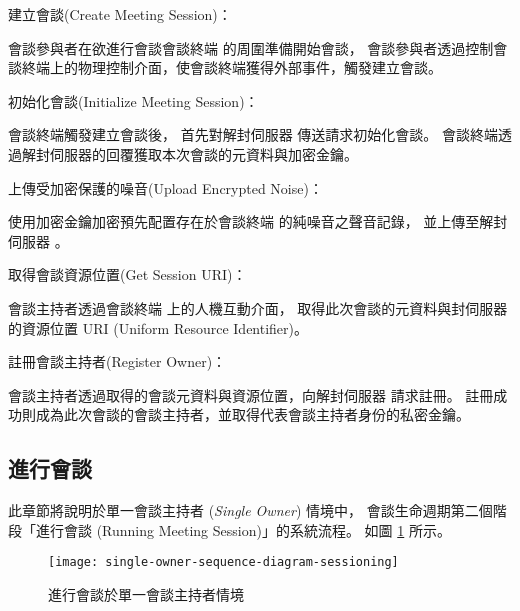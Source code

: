 \begin{steps}
    \item 建立會談(Create Meeting Session)：

            會談參與者在欲進行會談會談終端 \DEFmeetingbox 的周圍準備開始會談，
        會談參與者透過控制會談終端上的物理控制介面，使會談終端獲得外部事件，觸發建立會談。

    \item 初始化會談(Initialize Meeting Session)：

            會談終端觸發建立會談後，
        首先對解封伺服器 \DEFserver 傳送請求初始化會談。
        會談終端透過解封伺服器的回覆獲取本次會談的元資料與加密金鑰。

    \item 上傳受加密保護的噪音(Upload Encrypted Noise)：

            使用加密金鑰加密預先配置存在於會談終端 \DEFmeetingbox 的純噪音之聲音記錄，
        並上傳至解封伺服器 \DEFserver。

    \item 取得會談資源位置(Get Session URI)：

            會談主持者透過會談終端 \DEFmeetingbox 上的人機互動介面，
        取得此次會談的元資料與封伺服器的資源位置 URI (Uniform Resource Identifier)。

    \item 註冊會談主持者(Register Owner)：

            會談主持者透過取得的會談元資料與資源位置，向解封伺服器 \DEFserver 請求註冊。
        註冊成功則成為此次會談的會談主持者，並取得代表會談主持者身份的私密金鑰。
\end{steps}

\subsection{進行會談}\label{subsec:sessioning}

    此章節將說明於單一會談主持者 ({\it Single Owner}) 情境中，
會談生命週期第二個階段「進行會談 (Running Meeting Session)」的系統流程。
如圖 \ref{fig:s-o-sessioning} 所示。

\begin{figure}[H]
    \centering
    \texttt{[image: single-owner-sequence-diagram-sessioning]}
    \caption{進行會談於單一會談主持者情境}\label{fig:s-o-sessioning}
\end{figure}

